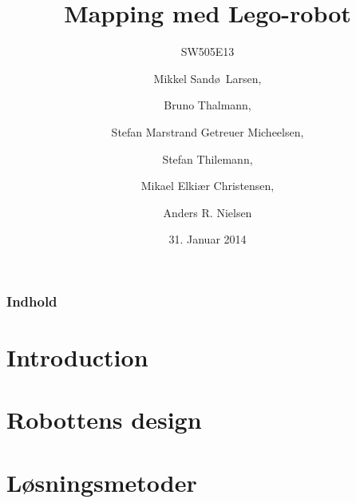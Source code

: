 \documentclass{beamer}
\title[Mapping med Lego-robot]{Mapping med Lego-robot}
\subtitle{SW505E13}
\author[SW505E13]{Mikkel Sand\o ~Larsen, \and Bruno Thalmann, \and Stefan Marstrand Getreuer Micheelsen, \and Stefan Thilemann, \and Mikael Elki\ae r Christensen, \and Anders R. Nielsen}
\institute[Aalborg University]
{
  Department of Computer Science\\
  Aalborg University}
\date[CFP 2003]{31. Januar 2014}
\begin{document}

\begin{frame}
  \titlepage
\end{frame}

\begin{frame}
    \frametitle{Indhold}
    \tableofcontents[sectionstyle=show/show,subsectionstyle=hide/hide/hide]
\end{frame}

\section{Introduction}





\section{Robottens design}


\section{Løsningsmetoder}


\end{document}
